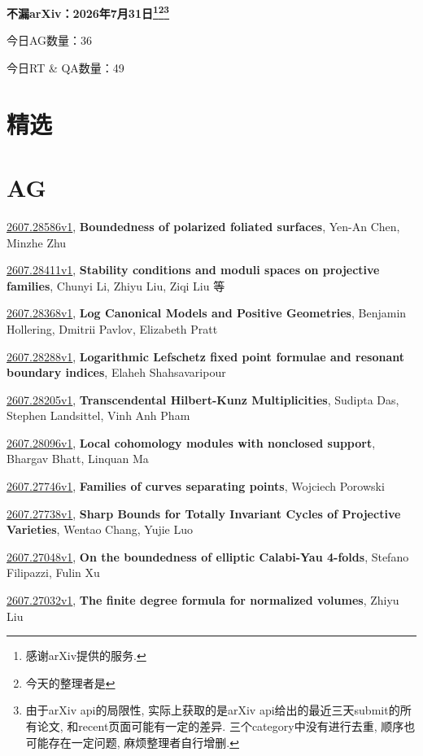 \documentclass[9pt, a4paper]{article}
\theoremstyle{plain}
\theoremstyle{definition}
\theoremstyle{remark}
\newcommand{\arxiv}[3]{\href{https://arxiv.org/abs/#1}{#1}, \textbf{\textcolor{arxivblue}{#2}}, #3}
\newcommand{\AGnumber}{36}
\newcommand{\RTQAnumber}{49}
\newcommand{\NewestDate}{2026年7月31日}
\newcommand{\todayarXiver}{} %
\begin{document}
\begin{center}
    \Huge\textbf{不漏arXiv：\NewestDate\footnote{感谢arXiv提供的服务.}\footnote{今天的整理者是\todayarXiver}\footnote{由于arXiv api的局限性, 实际上获取的是arXiv api给出的最近三天submit的所有论文, 和recent页面可能有一定的差异. 三个category中没有进行去重, 顺序也可能存在一定问题, 麻烦整理者自行增删.}} \\
\end{center}

\setcounter{section}{-1}

\begin{center}
    今日AG数量：\AGnumber
    
    今日RT \& QA数量：\RTQAnumber
    
\end{center}


\section{精选}


\section{AG}
\arxiv{2607.28586v1}{Boundedness of polarized foliated surfaces}{Yen-An Chen, Minzhe Zhu}

\arxiv{2607.28411v1}{Stability conditions and moduli spaces on projective families}{Chunyi Li, Zhiyu Liu, Ziqi Liu 等}

\arxiv{2607.28368v1}{Log Canonical Models and Positive Geometries}{Benjamin Hollering, Dmitrii Pavlov, Elizabeth Pratt}

\arxiv{2607.28288v1}{Logarithmic Lefschetz fixed point formulae and resonant boundary indices}{Elaheh Shahsavaripour}

\arxiv{2607.28205v1}{Transcendental Hilbert-Kunz Multiplicities}{Sudipta Das, Stephen Landsittel, Vinh Anh Pham}

\arxiv{2607.28096v1}{Local cohomology modules with nonclosed support}{Bhargav Bhatt, Linquan Ma}

\arxiv{2607.27746v1}{Families of curves separating points}{Wojciech Porowski}

\arxiv{2607.27738v1}{Sharp Bounds for Totally Invariant Cycles of Projective Varieties}{Wentao Chang, Yujie Luo}

\arxiv{2607.27048v1}{On the boundedness of elliptic Calabi-Yau 4-folds}{Stefano Filipazzi, Fulin Xu}

\arxiv{2607.27032v1}{The finite degree formula for normalized volumes}{Zhiyu Liu}
\end{document}
